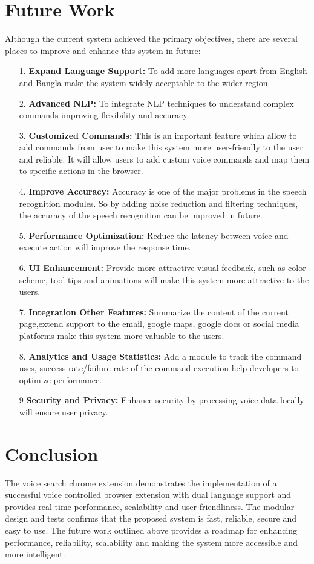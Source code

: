 \section{Future Work}
Although the current system achieved the primary objectives, there are several places to improve and enhance this system in future:
\begin{itemize}
\item[1.]	\textbf{Expand Language Support:} To add more languages apart from English and Bangla make the system widely acceptable to the wider region.
\item[2.]	\textbf{Advanced NLP:} To integrate NLP techniques to understand complex commands improving flexibility and accuracy.
\item[3.]	\textbf{Customized Commands:} This is an important feature which allow to add commands from user to make this system more user-friendly to the user and reliable. It will allow users to add custom voice commands and map them to specific actions in the browser.
\item[4.]	\textbf{Improve Accuracy:} Accuracy is one of the major problems in the speech recognition modules. So by adding noise reduction and filtering techniques, the accuracy of the speech recognition can be improved in future. 
\item[5.]	\textbf{Performance Optimization:} Reduce the latency between voice and execute action will improve the response time.
\item[6.]	\textbf{UI Enhancement:} Provide more attractive visual feedback, such as color scheme, tool tips and animations will make this system more attractive to the users.
\item[7.]	\textbf{Integration Other Features:} Summarize the content of the current page,extend support to the email, google maps, google docs or social media platforms make this system more valuable to the users.
\item[8.]    \textbf{Analytics and Usage Statistics:} Add a module to track the command uses, success rate/failure rate of the command execution help developers to optimize performance.
\item[9]	\textbf{Security and Privacy:} Enhance security by processing voice data locally will ensure user privacy.
\end{itemize}

\section{Conclusion}
The voice search chrome extension demonstrates the implementation of a successful voice controlled browser extension with dual language support and provides real-time performance, scalability and user-friendliness. The modular design and tests confirms that the proposed system is fast, reliable, secure and easy to use. The future work outlined above provides a roadmap for enhancing performance, reliability, scalability and making the system more accessible and more intelligent. 
